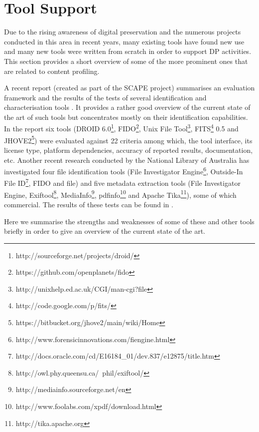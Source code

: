 \section{Tool Support}
Due to the rising awareness of digital preservation and the numerous projects conducted in this area in recent years, many existing tools have found new use and many new tools were written from scratch in order to support DP activities. This section provides a short overview of some of the more prominent ones that are related to content profiling.

A recent report (created as part of the SCAPE project) summarises an evaluation framework and the results of the tests of several identification and characterisation tools \cite{Knijff:2011it}. It provides a rather good overview of the current state of the art of such tools but concentrates mostly on their identification capabilities. In the report six tools (DROID 6.0\footnote{http://sourceforge.net/projects/droid/}, FIDO\footnote{https://github.com/openplanets/fido}, Unix File Tool\footnote{http://unixhelp.ed.ac.uk/CGI/man-cgi?file}, FITS\footnote{http://code.google.com/p/fits/} 0.5 and JHOVE2\footnote{https://bitbucket.org/jhove2/main/wiki/Home}) were evaluated against 22 criteria among which, the tool interface, its license type, platform dependencies, accuracy of reported results, documentation, etc. Another recent research conducted by the National Library of Australia has investigated four file identification tools (File Investigator Engine\footnote{http://www.forensicinnovations.com/fiengine.html}, Outside-In File ID\footnote{http://docs.oracle.com/cd/E16184\_01/dev.837/e12875/title.htm}, FIDO and file) and five metadata extraction tools (File Investigator Engine, Exiftool\footnote{http://owl.phy.queensu.ca/~phil/exiftool/}, MediaInfo\footnote{http://mediainfo.sourceforge.net/en}, pdfinfo\footnote{http://www.foolabs.com/xpdf/download.html} and Apache Tika\footnote{http://tika.apache.org}), some of which commercial. The results of these tests can be found in \cite{NLASP2452}.

Here we summarise the strengths and weaknesses of some of these and other tools briefly in order to give an overview of the current state of the art.

